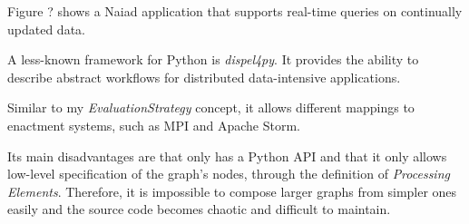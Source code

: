 \documentclass{dithesis}
\begin{document}
Figure ? shows a Naiad application that supports real-time queries on continually updated data.



A less-known framework for Python is \textit{dispel4py}. It provides the ability to describe abstract workflows for distributed data-intensive applications.

Similar to my \textit{EvaluationStrategy} concept, it allows different mappings to enactment systems, such as MPI and Apache Storm.

Its main disadvantages are that only has a Python API and that it only allows low-level specification of the graph's nodes, through the definition of \textit{Processing Elements}. Therefore, it is impossible to compose larger graphs from simpler ones easily and the source code becomes chaotic and difficult to maintain.






\end{document}

